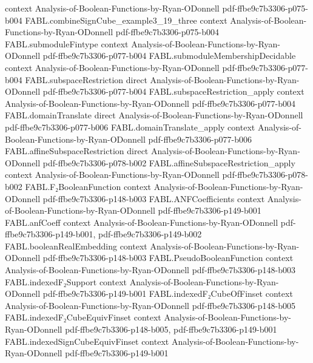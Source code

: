 \begin{theorem}
  {context}
  {Analysis-of-Boolean-Functions-by-Ryan-ODonnell}
  {pdf-ffbe9c7b3306-p075-b004}
\proofstep
  {FABL.combineSignCube_example3_19_three}
  {context}
  {Analysis-of-Boolean-Functions-by-Ryan-ODonnell}
  {pdf-ffbe9c7b3306-p075-b004}
\proofstep
  {FABL.submoduleFintype}
  {context}
  {Analysis-of-Boolean-Functions-by-Ryan-ODonnell}
  {pdf-ffbe9c7b3306-p077-b004}
\proofstep
  {FABL.submoduleMembershipDecidable}
  {context}
  {Analysis-of-Boolean-Functions-by-Ryan-ODonnell}
  {pdf-ffbe9c7b3306-p077-b004}
\proofstep
  {FABL.subspaceRestriction}
  {direct}
  {Analysis-of-Boolean-Functions-by-Ryan-ODonnell}
  {pdf-ffbe9c7b3306-p077-b004}
\proofstep
  {FABL.subspaceRestriction_apply}
  {context}
  {Analysis-of-Boolean-Functions-by-Ryan-ODonnell}
  {pdf-ffbe9c7b3306-p077-b004}
\proofstep
  {FABL.domainTranslate}
  {direct}
  {Analysis-of-Boolean-Functions-by-Ryan-ODonnell}
  {pdf-ffbe9c7b3306-p077-b006}
\proofstep
  {FABL.domainTranslate_apply}
  {context}
  {Analysis-of-Boolean-Functions-by-Ryan-ODonnell}
  {pdf-ffbe9c7b3306-p077-b006}
\proofstep
  {FABL.affineSubspaceRestriction}
  {direct}
  {Analysis-of-Boolean-Functions-by-Ryan-ODonnell}
  {pdf-ffbe9c7b3306-p078-b002}
\proofstep
  {FABL.affineSubspaceRestriction_apply}
  {context}
  {Analysis-of-Boolean-Functions-by-Ryan-ODonnell}
  {pdf-ffbe9c7b3306-p078-b002}
\proofstep
  {FABL.F₂BooleanFunction}
  {context}
  {Analysis-of-Boolean-Functions-by-Ryan-ODonnell}
  {pdf-ffbe9c7b3306-p148-b003}
\proofstep
  {FABL.ANFCoefficients}
  {context}
  {Analysis-of-Boolean-Functions-by-Ryan-ODonnell}
  {pdf-ffbe9c7b3306-p149-b001}
\proofstep
  {FABL.anfCoeff}
  {context}
  {Analysis-of-Boolean-Functions-by-Ryan-ODonnell}
  {pdf-ffbe9c7b3306-p149-b001,
    pdf-ffbe9c7b3306-p149-b002}
\proofstep
  {FABL.booleanRealEmbedding}
  {context}
  {Analysis-of-Boolean-Functions-by-Ryan-ODonnell}
  {pdf-ffbe9c7b3306-p148-b003}
\proofstep
  {FABL.PseudoBooleanFunction}
  {context}
  {Analysis-of-Boolean-Functions-by-Ryan-ODonnell}
  {pdf-ffbe9c7b3306-p148-b003}
\proofstep
  {FABL.indexedF₂Support}
  {context}
  {Analysis-of-Boolean-Functions-by-Ryan-ODonnell}
  {pdf-ffbe9c7b3306-p149-b001}
\proofstep
  {FABL.indexedF₂CubeOfFinset}
  {context}
  {Analysis-of-Boolean-Functions-by-Ryan-ODonnell}
  {pdf-ffbe9c7b3306-p148-b005}
\proofstep
  {FABL.indexedF₂CubeEquivFinset}
  {context}
  {Analysis-of-Boolean-Functions-by-Ryan-ODonnell}
  {pdf-ffbe9c7b3306-p148-b005,
    pdf-ffbe9c7b3306-p149-b001}
\proofstep
  {FABL.indexedSignCubeEquivFinset}
  {context}
  {Analysis-of-Boolean-Functions-by-Ryan-ODonnell}
  {pdf-ffbe9c7b3306-p149-b001}

\end{theorem}
